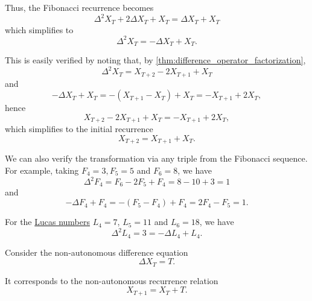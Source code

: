 \begin{example}
\begin{thmenum}
    Thus, the Fibonacci recurrence becomes
    \begin{equation*}
      \Delta^2 X_T + 2 \Delta X_T + X_T = \Delta X_T + X_T
    \end{equation*}
    which simplifies to
    \begin{equation}\label{eq:ex:def:difference_equation/fibonacci}
      \Delta^2 X_T = -\Delta X_T + X_T.
    \end{equation}

    This is easily verified by noting that, by \cref{thm:difference_operator_factorization},
    \begin{equation*}
      \Delta^2 X_T = X_{T+2} - 2X_{T+1} + X_T
    \end{equation*}
    and
    \begin{equation*}
      -\Delta X_T + X_T = -(X_{T+1} - X_T) + X_T = -X_{T+1} + 2X_T,
    \end{equation*}
    hence
    \begin{equation*}
      X_{T+2} - 2X_{T+1} + X_T = -X_{T+1} + 2X_T,
    \end{equation*}
    which simplifies to the initial recurrence
    \begin{equation*}
      X_{T+2} = X_{T+1} + X_T.
    \end{equation*}

    We can also verify the transformation via any triple from the Fibonacci sequence. For example, taking \( F_4 = 3, F_5 = 5 \) and \( F_6 = 8 \), we have
    \begin{equation*}
      \Delta^2 F_4 = F_6 - 2F_5 + F_4 = 8 - 10 + 3 = 1
    \end{equation*}
    and
    \begin{equation*}
      -\Delta F_4 + F_4 = -(F_5 - F_4) + F_4 = 2F_4 - F_5 = 1.
    \end{equation*}

    For the \hyperref[def:lucas_numbers]{Lucas numbers} \( L_4 = 7 \), \( L_5 = 11 \) and \( L_6 = 18 \), we have
    \begin{equation*}
      \Delta^2 L_4 = 3 = -\Delta L_4 + L_4.
    \end{equation*}

     Consider the non-autonomous difference equation
    \begin{equation*}
      \Delta X_T = T.
    \end{equation*}

    It corresponds to the non-autonomous recurrence relation
    \begin{equation*}
      X_{T+1} = X_T + T.
    \end{equation*}


\end{thmenum}
\end{example}
